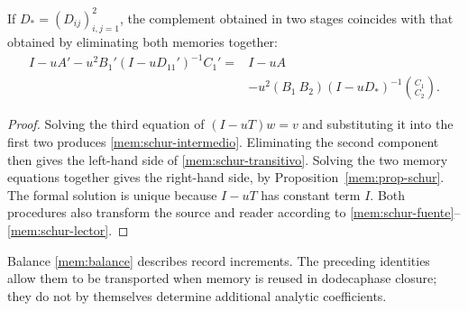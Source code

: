 \begin{proposition}
If \(D_*=(D_{ij})_{i,j=1}^2\), the complement obtained in two stages
coincides with that obtained by eliminating both memories together:
\begin{equation}
 \begin{split}
 I-uA'-u^2B_1'(I-uD_{11}')^{-1}C_1'
 ={}&I-uA\\
 &-u^2(B_1\ B_2)(I-uD_*)^{-1}\binom{C_1}{C_2}.
 \end{split}
 \label{mem:schur-transitivo}
\end{equation}
\end{proposition}
\begin{proof}
Solving the third equation of \((I-uT)w=v\) and substituting it into
the first two produces \eqref{mem:schur-intermedio}. Eliminating the
second component then gives the left-hand side of
\eqref{mem:schur-transitivo}. Solving the two memory equations
together gives the right-hand side, by Proposition~\ref{mem:prop-schur}.
The formal solution is unique because \(I-uT\) has constant term
\(I\). Both procedures also transform the source and reader according
to \eqref{mem:schur-fuente}--\eqref{mem:schur-lector}.
\end{proof}

Balance \eqref{mem:balance} describes record increments.
The preceding identities allow them to be transported when memory is
reused in dodecaphase closure; they do not by themselves determine
additional analytic coefficients.
